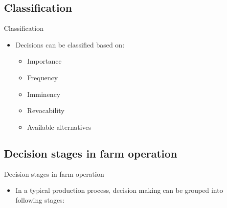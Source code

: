 \documentclass[12pt,ignorenonframetext,aspectratio=169]{beamer}
\providecommand{\tightlist}{%
  \setlength{\itemsep}{0pt}\setlength{\parskip}{0pt}}
\begin{document}
\hypertarget{classification}{%
\subsection{Classification}\label{classification}}

\begin{frame}{Classification}
\protect\hypertarget{classification-1}{}
\begin{itemize}
\tightlist
\item
  Decisions can be classified based on:

  \begin{itemize}
  \tightlist
  \item
    Importance
  \item
    Frequency
  \item
    Imminency
  \item
    Revocability
  \item
    Available alternatives
  \end{itemize}
\end{itemize}
\end{frame}

\hypertarget{decision-stages-in-farm-operation}{%
\subsection{Decision stages in farm
operation}\label{decision-stages-in-farm-operation}}

\begin{frame}{Decision stages in farm operation}
\small

\begin{itemize}
\tightlist
\item
  In a typical production process, decision making can be grouped into
  following stages:
\end{itemize}
\end{frame}
\end{document}
